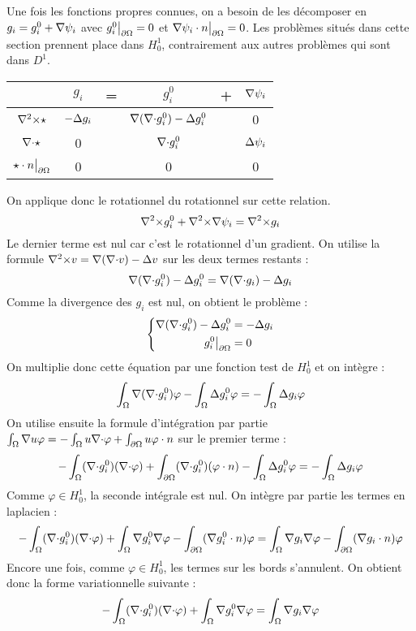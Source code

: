 Une fois les fonctions propres connues, on a besoin de les décomposer en $g_i=g_i^0+{\nabla}\psi_i$ avec $g_i^0{\big\rvert_{\partial\Omega}} = 0$ et ${\nabla}\psi_i\cdot n{\big\rvert_{\partial\Omega}} = 0$. Les problèmes situés dans cette section prennent place dans $H^1_0$, contrairement aux autres problèmes qui sont dans $D^1$.\\
\begin{center}
\begin{tabular}{c|ccccc}
& $g_i$ & = & $g_i^0$ & + & ${\nabla}\psi_i$ \\ \hline
${\nabla^2\times}\star$ & $-{\Delta} g_i$ & & ${\nabla}({\nabla\cdot} g_i^0)-{\Delta} g_i^0$ & & 0\\ \hline
${\nabla\cdot}\star$ & 0 & & ${\nabla\cdot} g_i^0$ & & ${\Delta}\psi_i$\\ \hline
$\star\cdot n{\big\rvert_{\partial\Omega}}$ & 0 & & 0 & & 0
\end{tabular}
\end{center}
On applique donc le rotationnel du rotationnel sur cette relation.\\
\[
{\nabla^2\times} g_i^0 +{\nabla^2\times}{\nabla}\psi_i = {\nabla^2\times} g_i
\]
Le dernier terme est nul car c'est le rotationnel d'un gradient. On utilise la formule ${\nabla^2\times} v={\nabla}({\nabla\cdot} v)-{\Delta} v$ sur les deux termes restants :
\[
{\nabla}({\nabla\cdot} g_i^0)-{\Delta} g_i^0 = {\nabla}({\nabla\cdot} g_i)-{\Delta} g_i
\]
Comme la divergence des $g_i$ est nul, on obtient le problème :
\begin{eqnarray}
\label{gi0}
\left\{
\begin{aligned}
{\nabla}({\nabla\cdot} g_i^0)-{\Delta} g_i^0 &= -{\Delta} g_i\\
g_i^0{\big\rvert_{\partial\Omega}} &= 0
\end{aligned}
\right.
\end{eqnarray}
On multiplie donc cette équation par une fonction test de $H^1_0$ et on intègre :
\[
\int_\Omega {\nabla}({\nabla\cdot} g_i^0)\varphi - \int_\Omega {\Delta} g_i^0\varphi = -\int_\Omega {\Delta} g_i\varphi
\]
On utilise ensuite la formule d'intégration par partie $\int_\Omega {\nabla} u\varphi = -\int_\Omega u{\nabla\cdot}\varphi + \int_{\partial\Omega} u\varphi\cdot n$ sur le premier terme :
\[
-\int_\Omega ({\nabla\cdot} g_i^0)({\nabla\cdot}\varphi) + \int_{\partial\Omega} ({\nabla\cdot} g_i^0)(\varphi\cdot n) - \int_\Omega {\Delta} g_i^0\varphi = -\int_\Omega {\Delta} g_i\varphi
\]
Comme $\varphi\in H^1_0$, la seconde intégrale est nul. On intègre par partie les termes en laplacien :
\[
-\int_\Omega ({\nabla\cdot} g_i^0)({\nabla\cdot}\varphi) + \int_\Omega {\nabla} g_i^0{\nabla}\varphi - \int_{\partial\Omega} ({\nabla} g_i^0\cdot n)\varphi = \int_\Omega {\nabla} g_i{\nabla}\varphi - \int_{\partial\Omega} ({\nabla} g_i\cdot n)\varphi
\]
Encore une fois, comme $\varphi\in H^1_0$, les termes sur les bords s'annulent. On obtient donc la forme variationnelle suivante :
\begin{eqnarray}
\label{fvgi0}
-\int_\Omega ({\nabla\cdot} g_i^0)({\nabla\cdot}\varphi) + \int_\Omega {\nabla} g_i^0{\nabla}\varphi = \int_\Omega {\nabla} g_i{\nabla}\varphi
\end{eqnarray}

